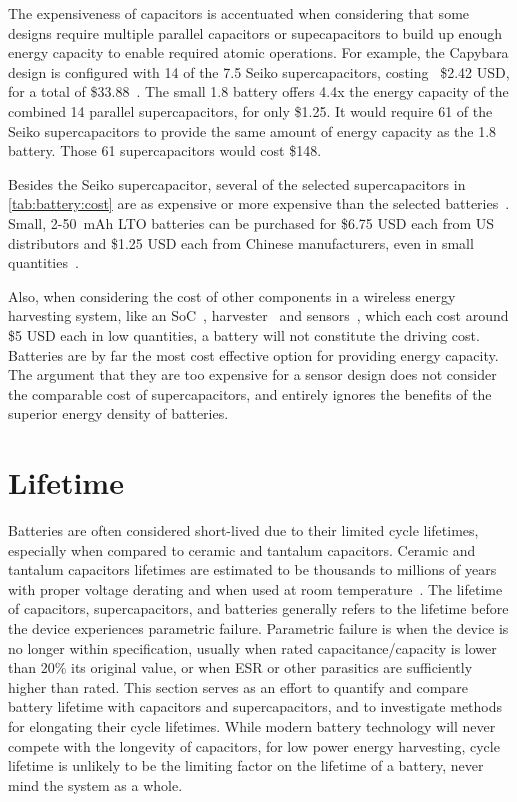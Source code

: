 The expensiveness of capacitors is accentuated when considering that some designs require multiple parallel capacitors or supecapacitors to build up enough energy capacity to enable required atomic operations. For example, the Capybara design is configured with 14 of the 7.5\ssi{\milli\farad} Seiko supercapacitors, costing ~\$2.42 USD, for a total of \$33.88~\cite{colinReconfigurable18}. The small 1.8 \ssi{\milli\Ah} battery offers 4.4x the energy capacity of the combined 14 parallel supercapacitors, for only \$1.25.
It would require 61 of the Seiko supercapacitors to provide the same amount of energy capacity as the 1.8\ssi{\milli\Ah} battery. Those 61 supercapacitors would cost \$148.

Besides the Seiko supercapacitor, several of the selected supercapacitors in \cref{tab:battery:cost} are as expensive or more expensive than the selected batteries~\cite{murataCap,kemetCap,seikoCap,bestCap}.
Small, 2-50~mAh LTO batteries can be purchased for
\$6.75 USD each from US distributors and \$1.25 USD each from Chinese manufacturers, even in small quantities~\cite{LTODatasheet, LTODatasheet2}. 

Also, when considering the cost of other components in a wireless energy harvesting system, like
an SoC~\cite{nrf52840}, harvester~\cite{sanyoSolarCell} and sensors~\cite{si7021},
which each cost around \$5 USD each in low quantities, a battery will not constitute
the driving cost. Batteries are by far the most cost effective option for providing energy capacity. The argument that they are too expensive for a sensor design does not consider the comparable cost of supercapacitors, and entirely ignores the benefits of the superior energy density of batteries. 


\section{Lifetime}
\label{sec:battery:life}
Batteries are often considered short-lived due to their limited cycle lifetimes, especially when compared to ceramic and tantalum capacitors. 
Ceramic and tantalum capacitors lifetimes are estimated to be thousands to millions of years with proper voltage derating and when used at room temperature~\cite{kemetLife}. 
The lifetime of capacitors, supercapacitors, and batteries generally refers to the lifetime before the device experiences parametric failure. Parametric failure is when the device is no longer within specification, usually when rated capacitance/capacity is lower than 20\% its original value, or when ESR or other parasitics are sufficiently higher than rated.
This section serves as an effort to quantify and compare battery lifetime with capacitors and supercapacitors, and to investigate methods for elongating their cycle lifetimes.
While modern battery technology will never compete with the longevity of capacitors, for low power energy harvesting, cycle lifetime is unlikely to be the limiting factor on the lifetime of a battery, never mind the system as a whole. 

